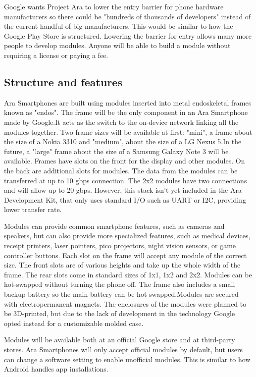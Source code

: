 Google wants Project Ara to lower the entry barrier for phone hardware manufacturers so there could be "hundreds of thousands of developers" instead of the current handful of big manufacturers. This would be similar to how the Google Play Store is structured. Lowering the barrier for entry allows many more people to develop modules. Anyone will be able to build a module without requiring a license or paying a fee.

\subsection{Structure and features}

Ara Smartphones are built using modules inserted into metal endoskeletal frames known as "endos". The frame will be the only component in an Ara Smartphone made by Google.It acts as the switch to the on-device network linking all the modules together. Two frame sizes will be available at first: "mini", a frame about the size of a Nokia 3310 and "medium", about the size of a LG Nexus 5.In the future, a "large" frame about the size of a Samsung Galaxy Note 3 will be available. Frames have slots on the front for the display and other modules. On the back are additional slots for modules. The data from the modules can be transferred at up to 10 gbps connection. The 2x2 modules have two connections and will allow up to 20 gbps. However, this stack isn't yet included in the Ara Development Kit, that only uses standard I/O such as UART or I2C, providing lower transfer rate.

Modules can provide common smartphone features, such as cameras and speakers, but can also provide more specialized features, such as medical devices, receipt printers, laser pointers, pico projectors, night vision sensors, or game controller buttons. Each slot on the frame will accept any module of the correct size. The front slots are of various heights and take up the whole width of the frame. The rear slots come in standard sizes of 1x1, 1x2 and 2x2. Modules can be hot-swapped without turning the phone off. The frame also includes a small backup battery so the main battery can be hot-swapped.Modules are secured with electropermanent magnets. The enclosures of the modules were planned to be 3D-printed, but due to the lack of development in the technology Google opted instead for a customizable molded case.

Modules will be available both at an official Google store and at third-party stores. Ara Smartphones will only accept official modules by default, but users can change a software setting to enable unofficial modules. This is similar to how Android handles app installations.

